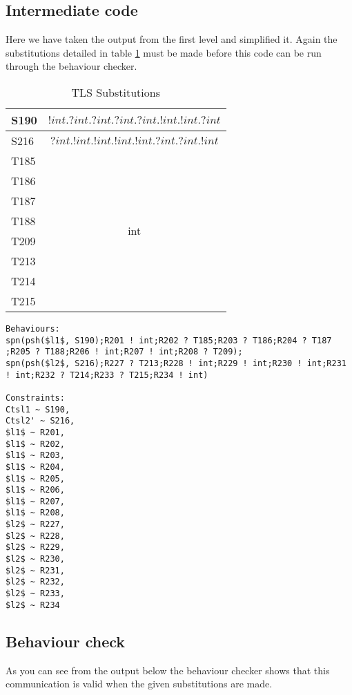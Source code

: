 \subsection{Intermediate code}
Here we have taken the output from the first level and simplified it. Again the substitutions detailed in table \ref{tLSSubs} must be made before this code can be run through the behaviour checker. 


\begin{table}
\centering
\begin{tabular}{|l | c|}
\hline
S190 &  $!int.?int.?int.?int.?int.!int.!int.?int$  \\ \hline
S216 & $?int.!int.!int.!int.!int.?int.?int.!int$ \\  \hline
T185 & \multirow{8}{*}{int} \\
T186 & \\ 
T187 & \\
T188 & \\ 
T209 & \\ 
T213 & \\ 
T214 & \\ 
T215 & \\ \hline
\end{tabular}
\caption{TLS Substitutions}
\label{tLSSubs}
\end{table}

\begin{lstlisting}
Behaviours:
spn(psh($l1$, S190);R201 ! int;R202 ? T185;R203 ? T186;R204 ? T187 ;R205 ? T188;R206 ! int;R207 ! int;R208 ? T209);
spn(psh($l2$, S216);R227 ? T213;R228 ! int;R229 ! int;R230 ! int;R231 ! int;R232 ? T214;R233 ? T215;R234 ! int)

Constraints:
Ctsl1 ~ S190,
Ctsl2' ~ S216,
$l1$ ~ R201,
$l1$ ~ R202,
$l1$ ~ R203,
$l1$ ~ R204,
$l1$ ~ R205,
$l1$ ~ R206,
$l1$ ~ R207,
$l1$ ~ R208,
$l2$ ~ R227,
$l2$ ~ R228,
$l2$ ~ R229,
$l2$ ~ R230,
$l2$ ~ R231,
$l2$ ~ R232,
$l2$ ~ R233,
$l2$ ~ R234
\end{lstlisting}



\subsection{Behaviour check}

As you can see from the output below the behaviour checker shows that this communication is valid when the given substitutions are made. 

